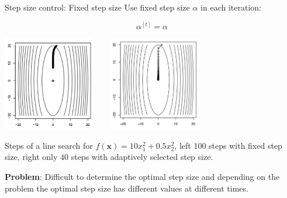 	
	\begin{vbframe}{Step size control: Fixed step size}
		Use fixed step size $\alpha$ in each iteration:
		
		\vspace*{-0.2cm}
		$$\alpha^{[t]} = \alpha$$
		
		\vspace*{-0.1cm}
		\begin{center}
			\includegraphics[width = 0.3\textwidth]{figure_man/stepsize_small.png} ~~~ \includegraphics[width = 0.3\textwidth]{figure_man/stepsize_adaptive.png} \\
			\begin{footnotesize}
				Steps of a line search for $f(\bm{x}) = 10 x_1^2 + 0.5 x_2^2$, left $100$ steps with fixed step size, right only $40$ steps with adaptively selected step size.
			\end{footnotesize}
		\end{center}
		
		\textbf{Problem}: Difficult to determine the optimal step size and depending on the problem the optimal step size has different values at different times. 
		
		
		
	\end{vbframe}
	

